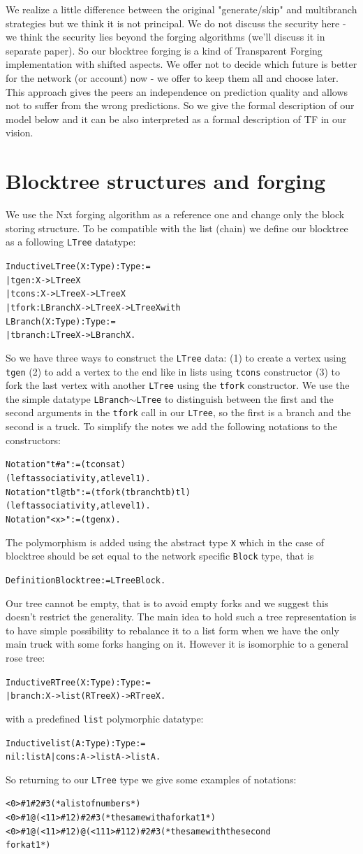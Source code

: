 \documentclass[12pt]{article}
\newcommand{\begver}{\begin{alltt}\begin{footnotesize}}
\newcommand{\enver}{\end{footnotesize}\end{alltt}}
\begin{document}
We realize a little difference between the original "generate/skip" and multibranch strategies but 
we think it is not principal. We do not discuss the security here \-- we think the security lies beyond the forging algorithms (we'll discuss it in separate 
paper). So our blocktree forging is a kind of Transparent Forging implementation with shifted aspects. We offer not to decide which future is better for the 
network (or account) now \-- we offer to keep them all and choose later. This approach gives the peers an independence on prediction 
quality and allows not to suffer from the wrong predictions. So we give the formal description of our model below and it can be also 
interpreted as a formal description of TF in our vision.

\section{Blocktree structures and forging}
We use the Nxt forging algorithm as a reference one and change only the block storing structure. To be compatible with the list (chain) we define our blocktree as a 
following \texttt{LTree} datatype:
\begver
Inductive LTree (X: Type) : Type :=
| tgen : X -> LTree X
| tcons : X -> LTree X -> LTree X
| tfork : LBranch X -> LTree X -> LTree X  with 
  LBranch (X: Type) : Type := 
  | tbranch : LTree X -> LBranch X.
\enver
So we have three ways to construct the \texttt{LTree} data: (1) to create a vertex using \texttt{tgen} (2) to add a vertex to the end like in lists using
\texttt{tcons} constructor (3) to fork the last vertex with another \texttt{LTree} using the \texttt{tfork} constructor. We use the the simple datatype
\texttt{LBranch}$\sim$\texttt{LTree} to distinguish between the first and the second arguments in the \texttt{tfork} call in our \texttt{LTree}, so the first is a branch and the 
second is a truck. To simplify the notes we add the following notations to the constructors:
\begver
Notation "t # a" := (tcons a t) 
                     (left associativity, at level 1).
Notation "tl @ tb" := (tfork (tbranch tb) tl) 
                     (left associativity, at level 1).
Notation "< x >" := (tgen x).
\enver 
The polymorphism is added using the abstract type \texttt{X} which in the case of blocktree should be set equal to the network specific \texttt{Block}
type, that is
\begver
Definition Blocktree := LTree Block.
\enver 
Our tree cannot be empty, that is to avoid empty forks and we suggest this doesn't restrict the generality. The main idea to hold such a tree representation
is to have simple possibility to rebalance it to a list form when we have the only main truck with some forks hanging on it. However it is isomorphic to a general 
rose tree:
\begver
Inductive RTree (X:Type) : Type :=
| branch : X -> list (RTree X) -> RTree X.
\enver 
with a predefined \texttt{list} polymorphic datatype:
\begver
Inductive list (A : Type) : Type :=
    nil : list A | cons : A -> list A -> list A.
\enver
So returning to our \texttt{LTree} type we give some examples of notations:
\begver
<0> # 1 # 2 # 3 (*a list of numbers*)
<0> # 1 @ (<11> # 12) # 2 # 3 (*the same with a fork at 1*)
<0> # 1 @ (<11> # 12) @ (<111> # 112) # 2 # 3 (*the same with the second 
                                                fork at 1*)
\enver
\end{document}
